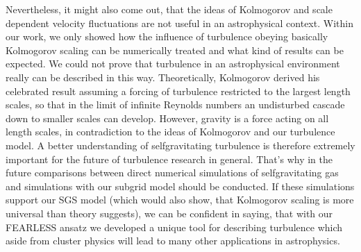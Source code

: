 Nevertheless, it might also come out, that the ideas of Kolmogorov and scale
dependent velocity fluctuations are not useful in an astrophysical context.
Within
our work, we only showed how the influence of turbulence obeying basically
Kolmogorov scaling can be numerically treated and what kind of results can be
expected. We could not prove that turbulence in an astrophysical environment
really can be described in this way. Theoretically, Kolmogorov derived
his celebrated result assuming a forcing of turbulence restricted to the largest
length scales, so that in the limit of infinite Reynolds numbers an undisturbed
cascade down to smaller scales can develop. However, gravity is a force acting
on
all length scales, in contradiction to the ideas of Kolmogorov and our
turbulence model. A better understanding of selfgravitating turbulence is
therefore extremely important for the future of turbulence research in
general. 
That's why in the future comparisons between direct numerical simulations of
selfgravitating gas and simulations with our subgrid model should be conducted.
If these simulations support our SGS model (which would also show, that
Kolmogorov scaling is more universal than theory suggests), we can be
confident in saying, that with our FEARLESS ansatz we developed a unique tool
for describing turbulence which aside from cluster physics will lead to many
other applications in astrophysics.  

